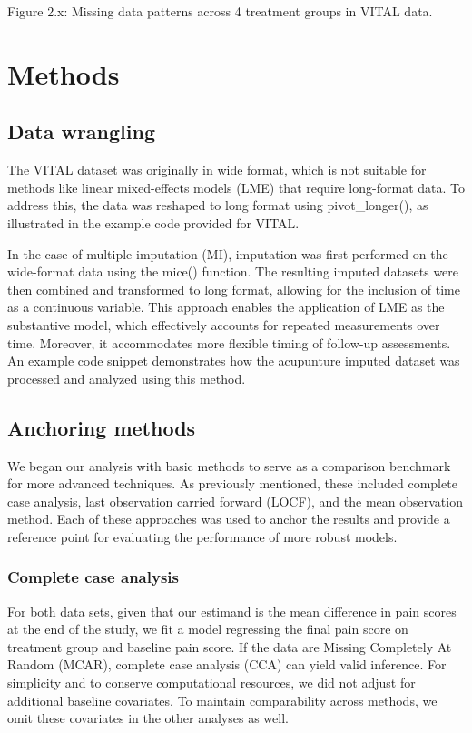 \documentclass{article}
\begin{document}
Figure 2.x: Missing data patterns across 4 treatment groups in VITAL
data.

\section{Methods}\label{methods}

\subsection{Data wrangling}\label{data-wrangling}

The VITAL dataset was originally in wide format, which is not suitable
for methods like linear mixed-effects models (LME) that require
long-format data. To address this, the data was reshaped to long format
using pivot\_longer(), as illustrated in the example code provided for
VITAL.

In the case of multiple imputation (MI), imputation was first performed
on the wide-format data using the mice() function. The resulting imputed
datasets were then combined and transformed to long format, allowing for
the inclusion of time as a continuous variable. This approach enables
the application of LME as the substantive model, which effectively
accounts for repeated measurements over time. Moreover, it accommodates
more flexible timing of follow-up assessments. An example code snippet
demonstrates how the acupunture imputed dataset was processed and
analyzed using this method.

\subsection{Anchoring methods}\label{anchoring-methods}

We began our analysis with basic methods to serve as a comparison
benchmark for more advanced techniques. As previously mentioned, these
included complete case analysis, last observation carried forward
(LOCF), and the mean observation method. Each of these approaches was
used to anchor the results and provide a reference point for evaluating
the performance of more robust models.

\subsubsection{Complete case analysis}\label{complete-case-analysis}

For both data sets, given that our estimand is the mean difference in
pain scores at the end of the study, we fit a model regressing the final
pain score on treatment group and baseline pain score. If the data are
Missing Completely At Random (MCAR), complete case analysis (CCA) can
yield valid inference. For simplicity and to conserve computational
resources, we did not adjust for additional baseline covariates. To
maintain comparability across methods, we omit these covariates in the
other analyses as well.
\end{document}

